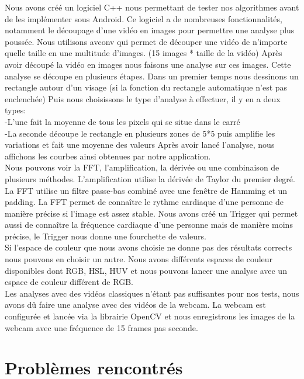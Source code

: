 	Nous avons créé un logiciel C++ nous permettant de tester nos algorithmes avant de les implémenter sous Android.
	Ce logiciel a de nombreuses fonctionnalités, notamment le découpage d'une vidéo en images pour permettre une analyse plus poussée.
	Nous utilisons avconv qui permet de découper une vidéo de n'importe quelle taille en une multitude d'images. (15 images * taille de la vidéo)
	Après avoir découpé la vidéo en images nous faisons une analyse sur ces images.
	Cette analyse se découpe en plusieurs étapes.
	Dans un premier temps nous dessinons un rectangle autour d'un visage (si la fonction du rectangle automatique n'est pas enclenchée)
	Puis nous choisissons le type d'analyse à effectuer, il y en a deux types:\\
		-L'une fait la moyenne de tous les pixels qui se situe dans le carré\\
		-La seconde découpe le rectangle en plusieurs zones de 5*5 puis amplifie les variations et fait une moyenne des valeurs
	Après avoir lancé l'analyse, nous affichons les courbes ainsi obtenues par notre application.\\

	Nous pouvons voir la FFT, l'amplification, la dérivée ou une combinaison de plusieurs méthodes.
	L'amplification utilise la dérivée de Taylor du premier degré.
	La FFT utilise un filtre passe-bas combiné avec une fenêtre de Hamming et un padding.
	La FFT permet de connaître le rythme cardiaque d'une personne de manière précise si l'image est assez stable.
	Nous avons créé un Trigger qui permet aussi de connaître la fréquence cardiaque d'une personne mais de manière moins précise, le Trigger nous donne une fourchette de valeurs.\\

	Si l'espace de couleur que nous avons choisie ne donne pas des résultats corrects nous pouvons en choisir un autre.
	Nous avons différents espaces de couleur disponibles dont RGB, HSL, HUV et nous pouvons lancer une analyse avec un espace de couleur différent de RGB.\\

	Les analyses avec des vidéos classiques n'étant pas suffisantes pour nos tests, nous avons dû faire une analyse avec des vidéos de la webcam.
	La webcam est configurée et lancée via la librairie OpenCV et nous enregistrons les images de la webcam avec une fréquence de 15 frames pas seconde.\\

\section{Problèmes rencontrés}

